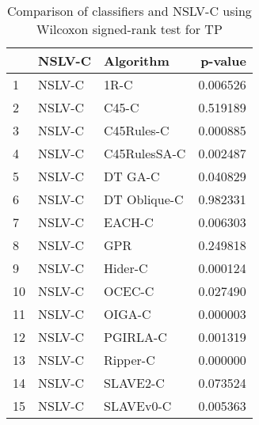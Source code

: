 \begin{table}
\footnotesize
\caption{Comparison of classifiers and NSLV-C using Wilcoxon signed-rank test for TP}
\label{tab:NSLV-C wilcoxon TP comparison}
\begin{tabular}{lllr}
\hline
 & NSLV-C & Algorithm & p-value \\
\hline
1 & NSLV-C & 1R-C & 0.006526 \\
2 & NSLV-C & C45-C & 0.519189 \\
3 & NSLV-C & C45Rules-C & 0.000885 \\
4 & NSLV-C & C45RulesSA-C & 0.002487 \\
5 & NSLV-C & DT GA-C & 0.040829 \\
6 & NSLV-C & DT Oblique-C & 0.982331 \\
7 & NSLV-C & EACH-C & 0.006303 \\
8 & NSLV-C & GPR & 0.249818 \\
9 & NSLV-C & Hider-C & 0.000124 \\
10 & NSLV-C & OCEC-C & 0.027490 \\
11 & NSLV-C & OIGA-C & 0.000003 \\
12 & NSLV-C & PGIRLA-C & 0.001319 \\
13 & NSLV-C & Ripper-C & 0.000000 \\
14 & NSLV-C & SLAVE2-C & 0.073524 \\
15 & NSLV-C & SLAVEv0-C & 0.005363 \\
\hline
\end{tabular}
\end{table}
